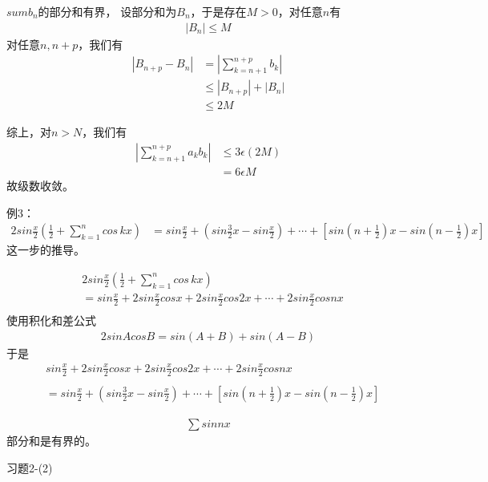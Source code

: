 \documentclass{article}
\begin{document}
$sum b_n$的部分和有界，
设部分和为$B_n$，于是存在$M > 0$，对任意$n$有
\begin{align*}
  |B_n| \leq M
\end{align*}
对任意$n, n + p$，我们有
\begin{align*}
  |B_{n + p} - B_n|
   & = \left| \sum\limits_{k = n + 1}^{n + p} b_k \right| \\
   & \leq |B_{n + p}| + |B_n|                             \\
   & \leq 2M
\end{align*}

综上，对$n > N$，我们有
\begin{align*}
  \left| \sum\limits_{k = n + 1}^{n + p} a_k b_k \right|
   & \leq 3\epsilon (2M) \\
   & = 6 \epsilon M
\end{align*}
故级数收敛。

\begin{zremark}
  例3：
  \begin{align*}
    2sin\frac{x}{2}\left( \frac{1}{2} + \sum\limits_{k=1}^n cos\, kx \right)
     & = sin \frac{x}{2} + \left( sin \frac{3}{2}x - sin \frac{x}{2} \right)
    + \cdots + \left[ sin(n + \frac{1}{2})x - sin(n - \frac{1}{2})x \right]
  \end{align*}
  这一步的推导。
\end{zremark}
\begin{align*}
   & 2sin\frac{x}{2}\left( \frac{1}{2} + \sum\limits_{k=1}^n cos\, kx \right)                           \\
   & = sin \frac{x}{2} + 2sin\frac{x}{2} cos x + 2sin\frac{x}{2}cos 2x + \cdots + 2sin\frac{x}{2}cos nx \\
\end{align*}
使用积化和差公式
\begin{align*}
  2 sin A cos B = sin (A + B) + sin (A - B)
\end{align*}
于是
\begin{align*}
   & sin \frac{x}{2} + 2sin\frac{x}{2} cos x + 2sin\frac{x}{2}cos 2x + \cdots + 2sin\frac{x}{2}cos nx \\                                                                      \\
   & = sin \frac{x}{2} + \left( sin \frac{3}{2}x - sin \frac{x}{2} \right)
  + \cdots + \left[ sin(n + \frac{1}{2})x - sin(n - \frac{1}{2})x \right]
\end{align*}

\begin{zremark}
  \begin{align*}
    \sum sin nx
  \end{align*}
  部分和是有界的。
\end{zremark}

习题2-(2)
\end{document}
